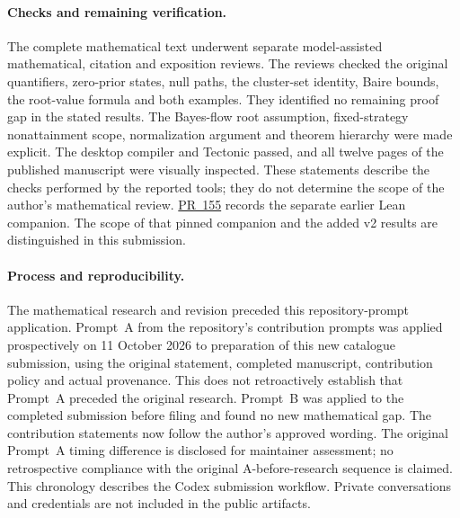 \documentclass[11pt,a4paper]{article}
\theoremstyle{definition}
\theoremstyle{remark}
\begin{document}
\paragraph{Checks and remaining verification.}
The complete mathematical text underwent separate model-assisted
mathematical, citation and exposition reviews. The reviews checked the
original quantifiers, zero-prior states, null paths, the cluster-set
identity, Baire bounds, the root-value formula and both examples.
They identified no remaining proof gap in the stated results. The
Bayes-flow root assumption, fixed-strategy nonattainment scope,
normalization argument and theorem hierarchy were made explicit.
The desktop compiler and Tectonic passed, and all twelve pages of the
published manuscript were visually inspected. These statements describe the checks performed by the reported tools;
they do not determine the scope of the author's mathematical review.
\href{https://github.com/mehmetmars7/Erdosproblems-llm-hunter/pull/155}{PR~155}
records the separate earlier Lean companion. The scope of that pinned
companion and the added v2 results are distinguished in this submission.

\paragraph{Process and reproducibility.}
The mathematical research and revision preceded this repository-prompt
application. Prompt~A from the repository's contribution prompts was
applied prospectively on 11 October 2026 to preparation of this new
catalogue submission, using the original statement, completed manuscript,
contribution policy and actual provenance. This does not retroactively
establish that Prompt~A preceded the original research. Prompt~B was
applied to the completed submission before filing and found no new
mathematical gap. The contribution statements now follow the author's
approved wording. The original Prompt~A timing difference is disclosed
for maintainer assessment; no retrospective compliance with the original
A-before-research sequence is claimed. This chronology describes the
Codex submission workflow. Private conversations and credentials are
not included in the public artifacts.
\end{document}
